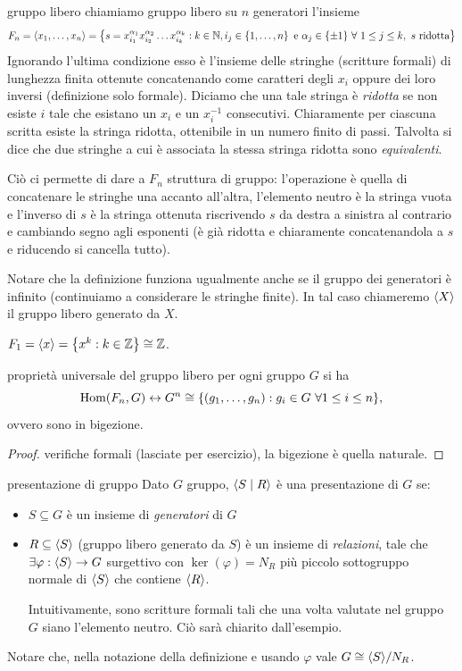 \begin{definition}{gruppo libero}
    chiamiamo gruppo libero su $n$ generatori l'insieme
    \[ F_n = \langle x_1, \dots, x_n \rangle = \left\{ s = x_{i_1}^{\alpha_1} x_{i_2}^{\alpha_2} \dots x_{i_k}^{\alpha_k} : k \in \mathbb{N}, i_j \in \left\{ 1,\dots,n \right\} \text{ e } \alpha_j \in \{\pm 1\} \ \forall \  1 \leq j \leq k, \ s \text{ ridotta} \right\} \]
    Ignorando l'ultima condizione esso è l'insieme delle stringhe (scritture formali) di lunghezza finita ottenute concatenando come caratteri degli $x_i$ oppure dei loro inversi (definizione solo formale). Diciamo che una tale stringa è \textit{ridotta} se non esiste $i$ tale che esistano un $x_i$ e un $x_i ^{-1}$ consecutivi. Chiaramente per ciascuna scritta esiste la stringa ridotta, ottenibile in un numero finito di passi. Talvolta si dice che due stringhe a cui è associata la stessa stringa ridotta sono \textit{equivalenti}.
    
    Ciò ci permette di dare a $F_n$ struttura di gruppo: l'operazione è quella di concatenare le stringhe una accanto all'altra, l'elemento neutro è la stringa vuota e l'inverso di $s$ è la stringa ottenuta riscrivendo $s$ da destra a sinistra al contrario e cambiando segno agli esponenti (è già ridotta e chiaramente concatenandola a $s$ e riducendo si cancella tutto).
    
    Notare che la definizione funziona ugualmente anche se il gruppo dei generatori è infinito (continuiamo a considerare le stringhe finite). In tal caso chiameremo $\langle X \rangle$ il gruppo libero generato da $X$. 
\end{definition}
\begin{example}
    $F_1 = \langle x \rangle = \left\{ x^k : k \in \mathbb{Z} \right\} \cong \mathbb{Z}$.
\end{example}
\begin{proposition}{proprietà universale del gruppo libero}
    per ogni gruppo $G$ si ha \[\text{Hom}(F_n, G) \leftrightarrow G^n \cong \{(g_1, \dots, g_n) : g_i \in G \ \forall 1 \leq i \leq n\}, \] ovvero sono in bigezione.
\end{proposition}
\begin{proof}
    verifiche formali (lasciate per esercizio), la bigezione è quella naturale. 
\end{proof}
\begin{definition}{presentazione di gruppo}
    Dato $G$ gruppo, $\langle S \mid R \rangle$ è una presentazione di $G$ se:
    \begin{itemize}
        \item $S\subseteq G$ è un insieme di \emph{generatori} di $G$
        \item $R \subseteq \langle S \rangle$ (gruppo libero generato da $S$) è un insieme di \emph{relazioni}, tale che $\exists \varphi: \langle S \rangle \rightarrow G$ surgettivo con $\ker(\varphi) = N_R$ più piccolo sottogruppo normale di $\langle S \rangle$ che contiene $\langle R \rangle$.

        Intuitivamente, sono scritture formali tali che una volta valutate nel gruppo $G$ siano l'elemento neutro. Ciò sarà chiarito dall'esempio.
    \end{itemize} 
    Notare che, nella notazione della definizione e usando $\varphi$ vale $G \cong \langle S \rangle/N_R$.
\end{definition}
